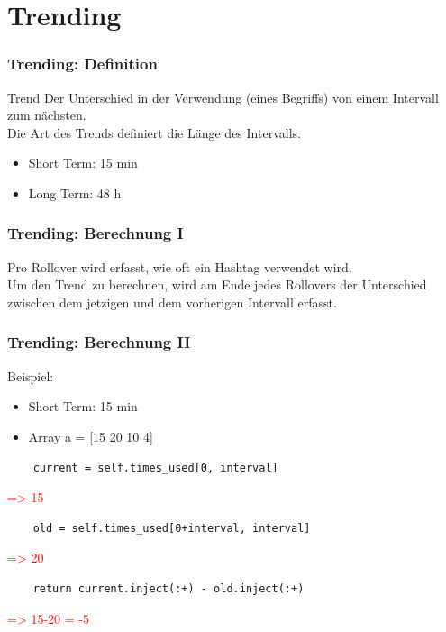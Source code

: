 \documentclass{beamer}
\begin{document}
\section{Trending}
\begin{frame}
  \frametitle{Trending: Definition} \pause
  \begin{block}{Trend}
    Der Unterschied in der Verwendung (eines Begriffs) von einem Intervall zum nächsten. \\ \pause
    Die Art des Trends definiert die Länge des Intervalls. \pause
    \begin{itemize}
      \item Short Term: 15 min \pause
      \item Long Term: 48 h
    \end{itemize}
  \end{block}
\end{frame}

\begin{frame}
  \frametitle{Trending: Berechnung I} \pause
  \begin{center}
      Pro Rollover wird erfasst, wie oft ein Hashtag verwendet wird. \\ \pause
      Um den Trend zu berechnen, wird am Ende jedes Rollovers der Unterschied zwischen dem jetzigen und dem vorherigen Intervall erfasst.
  \end{center}
\end{frame}

\begin{frame}[fragile]
  \frametitle{Trending: Berechnung II} \pause
  Beispiel:
  \begin{itemize}
    \item Short Term: 15 min \pause
    \item Array a = [15 20 10 4] \pause
  \end{itemize}
  
  \begin{lstlisting}
    current = self.times_used[0, interval]
  \end{lstlisting}\pause
  \textcolor{red}{=> 15}\pause
  \begin{lstlisting}
    old = self.times_used[0+interval, interval]
  \end{lstlisting}\pause
  \textcolor{red}{=> 20}\pause
  \begin{lstlisting}
    return current.inject(:+) - old.inject(:+)
  \end{lstlisting}\pause
  \textcolor{red}{=> 15-20 = -5}
\end{frame}
\end{document}
